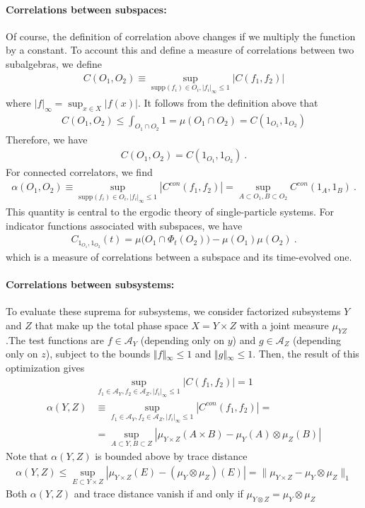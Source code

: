 \documentclass[a4paper,11pt]{article}
\theoremstyle{definition}
\newcommand{\mA}{\mathcal{A}}
\newcommand{\nn}{\nonumber}
\begin{document}
\paragraph{Correlations between subspaces:} Of course, the definition of correlation above changes if we multiply the function by a constant. To account this and define a measure of correlations between two subalgebras, we define
\begin{align}
    C(O_1,O_2)\equiv \sup_{\text{supp}(f_i)\in O_i,|f_i|_\infty\leq 1}|C(f_1,f_2)|
\end{align}
where $|f|_\infty=\sup_{x\in X}|f(x)|$. It follows from the definition above that 
\begin{align}
    C(O_1,O_2)\leq \int_{O_1\cap O_2} 1=\mu(O_1\cap O_2)=C(1_{O_1},1_{O_2})
\end{align}
Therefore, we have
\begin{align}
    C(O_1,O_2)=C(1_{O_1},1_{O_2})\ .
\end{align}
For connected correlators, we find 
\begin{align}
    \alpha(O_1,O_2)\equiv \sup_{\text{supp}(f_i)\in O_i,|f_i|_\infty\leq 1}|C^{con}(f_1,f_2)|=\sup_{A\subset O_1,B\subset O_2}C^{con}(1_{A},1_{B})\ .
\end{align}
This quantity is central to the ergodic theory of single-particle systems.
For indicator functions associated with subspaces, we have
\begin{align}
    C_{1_{O_1},1_{O_2}}(t)
    =\mu\bigl(O_1\cap\Phi_t(O_2)\bigr)-\mu(O_1)\mu(O_2)\ .
\end{align}
which is a measure of correlations between a subspace and its time-evolved one.

\paragraph{Correlations between subsystems:} To evaluate these suprema for subsystems, we consider factorized subsystems $Y$ and $Z$ that make up the total phase space $X = Y \times Z$ with a joint measure $\mu_{YZ}$.The test functions are $f \in \mathcal{A}_Y$ (depending only on $y$) and $g \in \mathcal{A}_Z$ (depending only on $z$), subject to the bounds $\Vert{}f\Vert{}_\infty \le 1$ and $\Vert{}g\Vert{}_\infty \le 1$. Then, the result of this optimization gives
\begin{align}
    &\sup_{f_1\in \mA_Y, f_2\in \mA_Z, |f_i|_\infty\leq 1}|C(f_1,f_2)|=1\nn\\
     \alpha(Y,Z)&\equiv \sup_{f_1\in \mA_Y, f_2\in \mA_Z, |f_i|_\infty\leq 1}|C^{con}(f_1,f_2)|=\nn\\
     &=\sup_{A\subset Y,B\subset Z}|\mu_{Y\times Z}(A\times B)-\mu_Y(A)\otimes \mu_Z(B)|
\end{align}
Note that $\alpha(Y,Z)$ is bounded above by trace distance
\begin{align}
    \alpha(Y,Z)\leq \sup_{E\subset Y\times Z}|\mu_{Y\times Z}(E)-(\mu_Y\otimes \mu_Z)(E)|=\|\mu_{Y\times Z}-\mu_Y\otimes \mu_Z\|_1
\end{align}
Both $\alpha(Y,Z)$ and trace distance vanish if and only if $\mu_{Y\otimes Z}=\mu_Y\otimes \mu_Z$
\end{document}
